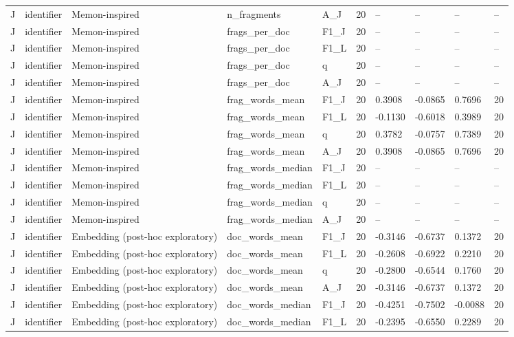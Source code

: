 \begin{table}[t]
{\begin{tabular}{llllllllll}
J & identifier & Memon-inspired & n\_fragments & A\_J & 20 & -- & -- & -- & -- \\
J & identifier & Memon-inspired & frags\_per\_doc & F1\_J & 20 & -- & -- & -- & -- \\
J & identifier & Memon-inspired & frags\_per\_doc & F1\_L & 20 & -- & -- & -- & -- \\
J & identifier & Memon-inspired & frags\_per\_doc & q & 20 & -- & -- & -- & -- \\
J & identifier & Memon-inspired & frags\_per\_doc & A\_J & 20 & -- & -- & -- & -- \\
J & identifier & Memon-inspired & frag\_words\_mean & F1\_J & 20 & 0.3908 & -0.0865 & 0.7696 & 20 \\
J & identifier & Memon-inspired & frag\_words\_mean & F1\_L & 20 & -0.1130 & -0.6018 & 0.3989 & 20 \\
J & identifier & Memon-inspired & frag\_words\_mean & q & 20 & 0.3782 & -0.0757 & 0.7389 & 20 \\
J & identifier & Memon-inspired & frag\_words\_mean & A\_J & 20 & 0.3908 & -0.0865 & 0.7696 & 20 \\
J & identifier & Memon-inspired & frag\_words\_median & F1\_J & 20 & -- & -- & -- & -- \\
J & identifier & Memon-inspired & frag\_words\_median & F1\_L & 20 & -- & -- & -- & -- \\
J & identifier & Memon-inspired & frag\_words\_median & q & 20 & -- & -- & -- & -- \\
J & identifier & Memon-inspired & frag\_words\_median & A\_J & 20 & -- & -- & -- & -- \\
J & identifier & Embedding (post-hoc exploratory) & doc\_words\_mean & F1\_J & 20 & -0.3146 & -0.6737 & 0.1372 & 20 \\
J & identifier & Embedding (post-hoc exploratory) & doc\_words\_mean & F1\_L & 20 & -0.2608 & -0.6922 & 0.2210 & 20 \\
J & identifier & Embedding (post-hoc exploratory) & doc\_words\_mean & q & 20 & -0.2800 & -0.6544 & 0.1760 & 20 \\
J & identifier & Embedding (post-hoc exploratory) & doc\_words\_mean & A\_J & 20 & -0.3146 & -0.6737 & 0.1372 & 20 \\
J & identifier & Embedding (post-hoc exploratory) & doc\_words\_median & F1\_J & 20 & -0.4251 & -0.7502 & -0.0088 & 20 \\
J & identifier & Embedding (post-hoc exploratory) & doc\_words\_median & F1\_L & 20 & -0.2395 & -0.6550 & 0.2289 & 20 \\

\end{tabular}}
\end{table}
